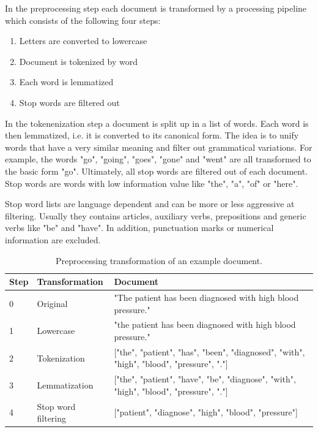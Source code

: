 In the preprocessing step each document is transformed by a processing pipeline which consists of the following four steps:

\begin{enumerate} 
	\item Letters are converted to lowercase
	\item Document is tokenized by word
	\item Each word is lemmatized
	\item Stop words are filtered out
\end{enumerate}

In the tokenenization step a document is split up in a list of words.
Each word is then lemmatized, i.e. it is converted to its canonical form.
The idea is to unify words that have a very similar meaning and filter out grammatical variations.
For example, the words  "go", "going", "goes", "gone" and "went" are all transformed to the basic form "go".
Ultimately, all stop words are filtered out of each document.
Stop words are words with low information value like "the", "a", "of" or "here".

Stop word lists are language dependent and can be more or less aggressive at filtering.
Usually they contains articles, auxiliary verbs, prepositions and generic verbs like "be" and "have".
In addition, punctuation marks or numerical information are excluded.

\begin{table}[]
	\begin{tabularx}{\textwidth}{l l p{9.8cm}}
		\toprule
		\textbf{Step} & \textbf{Transformation} & \textbf{Document}                                                       \\ \midrule
		0             & Original       & "The patient has been diagnosed with high blood pressure." \\
		1             & Lowercase               & "the patient has been diagnosed with high blood pressure." \\
		2 & Tokenization  & {[}"the", "patient", "has", "been", "diagnosed", "with", "high", "blood", "pressure", "."{]} \\
		3 & Lemmatization & {[}"the", "patient", "have", "be", "diagnose", "with", "high", "blood", "pressure", "."{]}   \\
		4             & Stop word filtering     & {[}"patient", "diagnose", "high", "blood", "pressure"{]} \\ \bottomrule
	\end{tabularx}
	\caption{Preprocessing transformation of an example document.}
	\label{tab:text-preprocessing}
\end{table}







